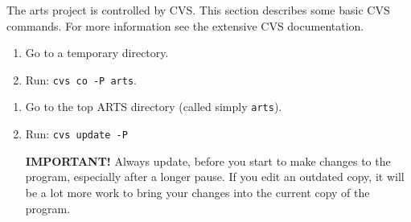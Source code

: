  \label{sec:development:cvs}

The arts project is controlled by CVS. This section describes some
basic CVS commands. For more information see the extensive CVS
documentation. 


\begin{enumerate}
\item Go to a temporary directory.
\item Run: \verb|cvs co -P arts|.
\end{enumerate}


\begin{enumerate}
\item Go to the top ARTS directory (called simply \verb|arts|).
\item Run: \verb|cvs update -P|
   
  \textbf{IMPORTANT!} Always update, before you start to make changes
  to the program, especially after a longer pause. If you edit an
  outdated copy, it will be a lot more work to bring your changes into
  the current copy of the program.
\end{enumerate}


